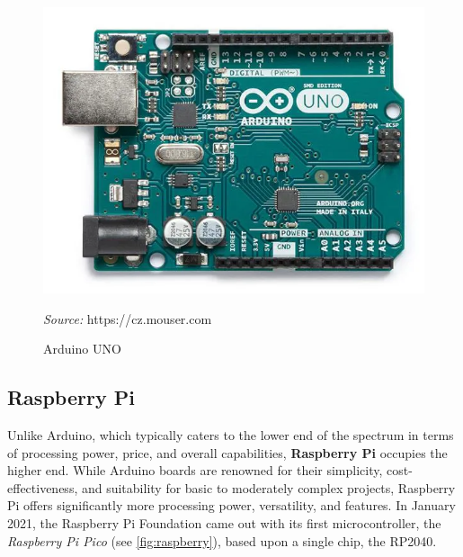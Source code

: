 \documentclass[FM,BP,EN,fonts]{tulthesis}
\begin{document}
\begin{figure}[H]
    \centering
    \includegraphics[scale=.3]{media/arduino.png}
    \caption{Arduino UNO}
    \textit{Source:} https://cz.mouser.com
    \label{fig:arduino}
\end{figure}

\subsection{Raspberry Pi}
Unlike Arduino, which typically caters to the lower end of the spectrum in terms of processing power, price, and overall capabilities, \textbf{Raspberry Pi} occupies the higher end. While Arduino boards are renowned for their simplicity, cost-effectiveness, and suitability for basic to moderately complex projects, Raspberry Pi offers significantly more processing power, versatility, and features. In January 2021, the Raspberry Pi Foundation came out with its first microcontroller, the \textit{Raspberry Pi Pico} (see \autoref{fig:raspberry}), based upon a single chip, the RP2040.
\end{document}
